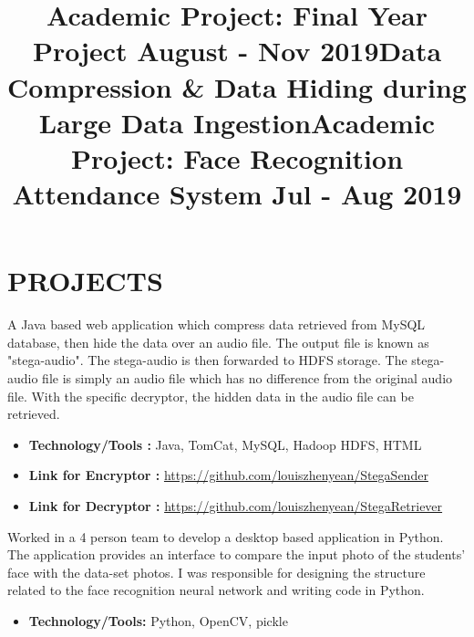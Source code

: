 \section{PROJECTS}
\employer{}
\location{}
\title{\textbf{Academic Project: Final Year Project \hfill August - Nov 2019}}
\begin{position}
\end{position}
\vspace{-1.2cm}

\employer{}
\location{}
\title{\textbf{Data Compression \& Data Hiding during Large Data Ingestion}}
\begin{position}
    A Java based web application which compress data retrieved from MySQL database, then hide the data over an audio file. The output file is known as "stega-audio". The stega-audio is then forwarded to HDFS storage. The stega-audio file is simply an audio file which has no difference from the original audio file. With the specific decryptor, the hidden data in the audio file can be retrieved. \vspace{0.3cm}
    \begin{itemize}
        \item \textbf{Technology/Tools :} Java, TomCat, MySQL, Hadoop HDFS, HTML
        \item \textbf{Link for Encryptor :} \url{https://github.com/louiszhenyean/StegaSender}
        \item \textbf{Link for Decryptor :} \url{https://github.com/louiszhenyean/StegaRetriever}
    \end{itemize}
\end{position}

\employer{}
\location{}
\title{\textbf{Academic Project: Face Recognition Attendance System \hfill Jul - Aug 2019}
 }
\begin{position}
    Worked in a 4 person team to develop a desktop based application in Python. The application provides an interface to compare the input photo of the students' face with the data-set photos. I was responsible for designing the structure related to the face recognition neural network and writing code in Python. \vspace{0.2cm}
    \begin{itemize}
        \item \textbf{Technology/Tools:} Python, OpenCV, pickle
    \end{itemize}
\end{position}

